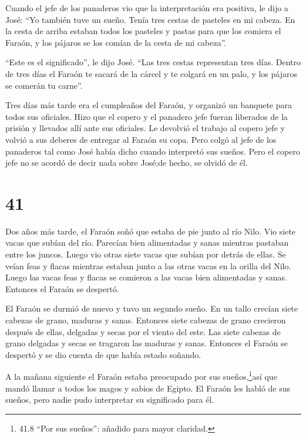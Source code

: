  Cuando el jefe de los panaderos vio que la interpretación
era positiva, le dijo a José: ``Yo también tuve un sueño. Tenía tres
cestas de pasteles en mi cabeza.  En la cesta de arriba
estaban todos los pasteles y pastas para que los comiera el Faraón, y
los pájaros se los comían de la cesta de mi cabeza''.

 ``Este es el significado'', le dijo José. ``Las tres
cestas representan tres días.  Dentro de tres días el
Faraón te sacará de la cárcel y te colgará en un palo, y los pájaros se
comerán tu carne''.

 Tres días más tarde era el cumpleaños del Faraón, y
organizó un banquete para todos sus oficiales. Hizo que el copero y el
panadero jefe fueran liberados de la prisión y llevados allí ante sus
oficiales.  Le devolvió el trabajo al copero jefe y volvió
a sus deberes de entregar al Faraón su copa.  Pero colgó al
jefe de los panaderos tal como José había dicho cuando interpretó sus
sueños.  Pero el copero jefe no se acordó de decir nada
sobre José;de hecho, se olvidó de él.

\hypertarget{section-40}{%
\section{41}\label{section-40}}

 Dos años más tarde, el Faraón soñó que estaba de pie junto
al río Nilo.  Vio siete vacas que subían del río. Parecían
bien alimentadas y sanas mientras pastaban entre los juncos.
 Luego vio otras siete vacas que subían por detrás de ellas.
Se veían feas y flacas mientras estaban junto a las otras vacas en la
orilla del Nilo.  Luego las vacas feas y flacas se comieron
a las vacas bien alimentadas y sanas. Entonces el Faraón se despertó.

 El Faraón se durmió de nuevo y tuvo un segundo sueño. En un
tallo crecían siete cabezas de grano, maduras y sanas. 
Entonces siete cabezas de grano crecieron después de ellas, delgadas y
secas por el viento del este.  Las siete cabezas de grano
delgadas y secas se tragaron las maduras y sanas. Entonces el Faraón se
despertó y se dio cuenta de que había estado soñando.

 A la mañana siguiente el Faraón estaba preocupado por sus
sueños,\footnote{41.8 ``Por sus sueños'': añadido para mayor claridad.}así
que mandó llamar a todos los magos y sabios de Egipto. El Faraón les
habló de sus sueños, pero nadie pudo interpretar su significado para él.

